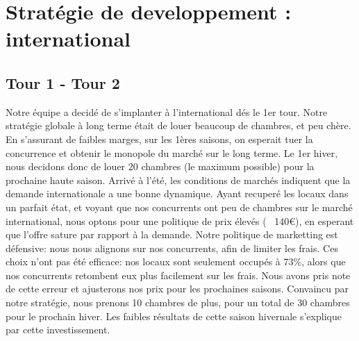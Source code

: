 \documentclass[a4paper,10pt]{article}
\begin{document}
   \newpage
   \section{Stratégie de developpement : international}
    
    \subsection{Tour 1 - Tour 2}
      Notre équipe a decidé de s'implanter à l'international dés le 1er tour.
      \newline
      Notre stratégie globale à long terme était de louer beaucoup de chambres, et peu chère. En s'assurant de faibles marges,
      sur les 1ères saisons, on esperait tuer la concurrence et obtenir le monopole du marché sur le long terme.
      \newline
      \newline
      Le 1er hiver, nous decidons donc de louer 20 chambres (le maximum possible) pour la prochaine haute saison.
      \newline
      \newline
      Arrivé à l'été, les conditions de marchés indiquent que la demande internationale a une bonne dynamique.
      Ayant recuperé les locaux dans un parfait état, et voyant que nos concurrents ont peu de chambres sur le marché international,
      nous optons pour une politique de prix élevés (~ 140€), en esperant que l'offre sature par rapport à la demande.
      Notre politique de marketting est défensive: nous nous alignons sur nos concurrents, afin de limiter les frais.
      \newline
      Ces choix n'ont pas été efficace: nos locaux sont seulement occupés à 73\%, alors que nos concurrents retombent eux plus facilement sur les frais.
      Nous avons pris note de cette erreur et ajusterons nos prix pour les prochaines saisons.
      \newline
      \newline
      Convaincu par notre stratégie, nous prenons 10 chambres de plus, pour un total de 30 chambres pour le prochain hiver.
      \newline
      Les faibles résultats de cette saison hivernale s'explique par cette investissement.
\end{document}
